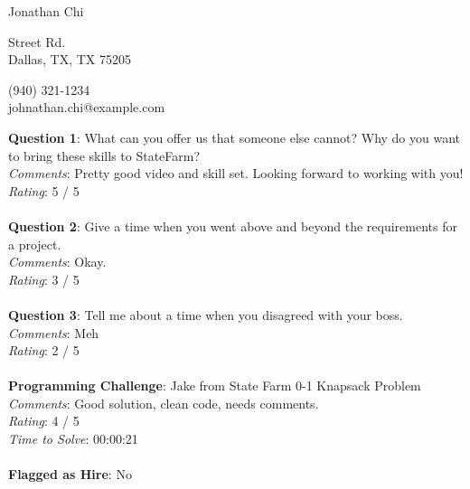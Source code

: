 \documentclass[12pt]{article}
\begin{document}
{\LARGE \begin{center}Jonathan Chi\end{center}}

\begin{multicols}{2}
 Street Rd. \\
Dallas, TX, TX 75205
\columnbreak

\noindent
(940) 321-1234 \\
johnathan.chi@example.com
\end{multicols}

\noindent
\textbf{Question 1}: What can you offer us that someone else cannot? Why do you want to bring these skills to StateFarm?
\\\noindent
\textit{Comments}: Pretty good video and skill set. Looking forward to working with you!
\\\noindent
\textit{Rating}: 5 / 5
\\\\
\noindent
\textbf{Question 2}: Give a time when you went above and beyond the requirements for a project.
\\\noindent
\textit{Comments}: Okay.
\\\noindent
\textit{Rating}: 3 / 5
\\\\
\noindent
\textbf{Question 3}: Tell me about a time when you disagreed with your boss.
\\\noindent
\textit{Comments}: Meh
\\\noindent
\textit{Rating}: 2 / 5
\\\\
\noindent
\textbf{Programming Challenge}: Jake from State Farm 0-1 Knapsack Problem
\\\noindent
\textit{Comments}: Good solution, clean code, needs comments.
\\\noindent
\textit{Rating}: 4 / 5
\\\noindent
\textit{Time to Solve}: 00:00:21
\\\\
\textbf{Flagged as Hire}: No
\\\\ 
\end{document}
